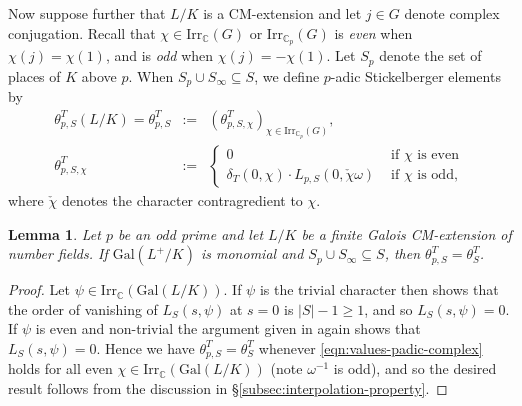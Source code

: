 \documentclass[12pt]{amsart}
\theoremstyle{plain}
\newtheorem{lemma}[theorem]{Lemma}
\theoremstyle{remark}
\theoremstyle{definition}
\numberwithin{equation}{section}
\begin{document}
{Now suppose further that $L/K$ is a CM-extension and let $j \in G$ denote complex conjugation.
Recall that $\chi \in {\mathrm{Irr}}_{\mathbb{C}}(G)$ or ${\mathrm{Irr}}_{{\mathbb{C}}_{p}}(G)$ is \emph{even} when $\chi(j) = \chi(1)$, 
and is \emph{odd} when $\chi(j) = -\chi(1)$.
Let $S_{p}$ denote the set of places of $K$ above $p$.
When $S_{p} \cup S_{\infty} \subseteq S$, we define $p$-adic Stickelberger elements by
\begin{eqnarray*}
\theta_{p,S}^{T}(L/K)  =  \theta_{p,S}^{T} & := & (\theta_{p,S,\chi}^{T})_{\chi \in {\mathrm{Irr}}_{{\mathbb{C}}_{p}} (G)},\\
\theta_{p,S,\chi}^{T} & := & \left\{ \begin{array}{ll} 0 & \mbox{ if } \chi \mbox{ is even}\\
                                        \delta_{T}(0,\chi) \cdot L_{p,S}(0,\check{\chi} \omega) & \mbox{ if } \chi \mbox{ is odd},
                                        \end{array} \right.
\end{eqnarray*}
where $\check \chi$ denotes the character contragredient to $\chi$.

\begin{lemma} \label{lem:p-adic-vs-complex-Stickelberger}
Let $p$ be an odd prime and let $L/K$ be a finite Galois CM-extension of number fields.
If ${\mathrm{Gal}}(L^{+}/K)$ is monomial and $ S_{p} \cup S_{\infty} \subseteq S$, then
$\theta_{p,S}^{T} = \theta_{S}^{T}$.
\end{lemma}

\begin{proof}
Let $\psi \in {\mathrm{Irr}}_{\mathbb{C}}({\mathrm{Gal}}(L/K))$. 
If $\psi$ is the trivial character then \cite[Chapter I, Proposition 3.4]{MR782485} shows that the order of vanishing of
$L_{S}(s,\psi)$ at $s=0$ is $|S|-1 \geq 1$, and so $L_{S}(s,\psi)=0$.
If $\psi$ is even and non-trivial the argument given in \cite[top of p.\ 71]{MR782485} again shows that $L_{S}(s,\psi)=0$.
Hence we have
$\theta_{p,S}^{T} = \theta_{S}^{T}$ whenever \eqref{eqn:values-padic-complex} holds for all even 
$\chi \in {\mathrm{Irr}}_{\mathbb{C}}({\mathrm{Gal}}(L/K))$ (note $\omega^{-1}$ is odd),
and so the desired result follows from the discussion in \S \ref{subsec:interpolation-property}.
\end{proof}

}
\end{document}
